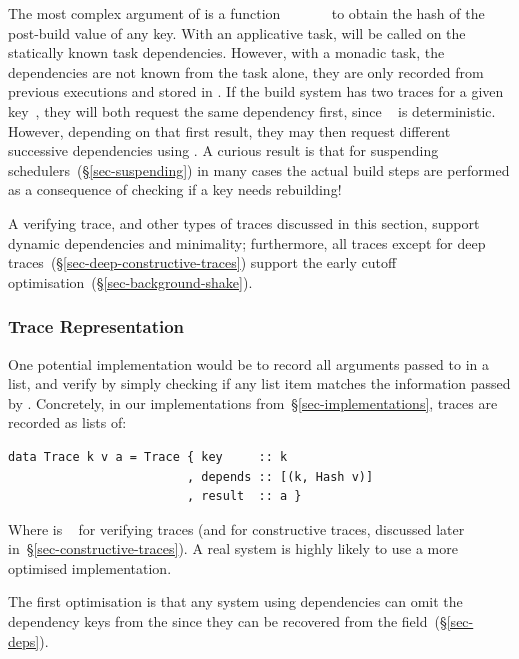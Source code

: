 The most complex argument of  is a function
~\hs{::}~~\hs{->}~~~ to obtain the
hash of the post-build value of any key. With an applicative task,
 will be called on the statically known task dependencies.
However, with a monadic task, the dependencies are not known from the task
alone, they are only recorded from previous executions and stored in . If
the build system has two traces for a given key~, they will both request
the same dependency first, since ~ is deterministic. However,
depending on that first result, they may then request different successive
dependencies using . A curious result is that for suspending
schedulers~(\S\ref{sec-suspending}) in many cases the actual build steps are
performed as a consequence of checking if a key needs rebuilding!

A verifying trace, and other types of traces discussed in this section, support
dynamic dependencies and minimality; furthermore, all traces except for deep
traces~(\S\ref{sec-deep-constructive-traces}) support the early cutoff
optimisation~(\S\ref{sec-background-shake}).

\subsubsection{Trace Representation}

One potential implementation would be to record all arguments passed to
 in a list, and verify by simply checking if any list item matches
the information passed by . Concretely, in our implementations
from~\S\ref{sec-implementations}, traces are recorded as lists of:

\vspace{1mm}
\begin{verbatim}
data Trace k v a = Trace { key     :: k
                         , depends :: [(k, Hash v)]
                         , result  :: a }
\end{verbatim}
\vspace{1mm}

\noindent
Where  is ~ for verifying traces (and  for
constructive traces, discussed later in~\S\ref{sec-constructive-traces}). A real
system is highly likely to use a more optimised implementation.

The first optimisation is that any system using  dependencies
can omit the dependency keys from the  since they can be recovered
from the  field~(\S\ref{sec-deps}).

